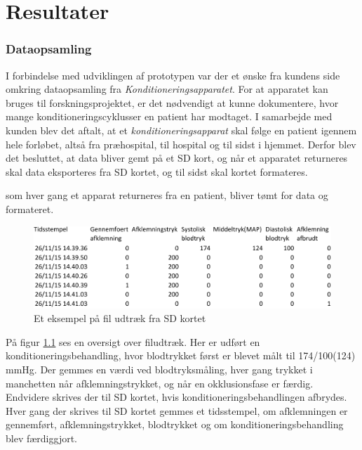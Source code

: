 \chapter{Resultater} \label{title:resultater}




\subsection{Dataopsamling}
I forbindelse med udviklingen af prototypen var der et ønske fra kundens side omkring dataopsamling fra \textit{Konditioneringsapparatet}. For at apparatet kan bruges til forskningsprojektet, er det nødvendigt at kunne dokumentere, hvor mange konditioneringscyklusser en patient har modtaget. I samarbejde med kunden blev det aftalt, at et \textit{konditioneringsapparat} skal følge en patient igennem hele forløbet, altså fra præhospital, til hospital og til sidst i hjemmet. Derfor blev det besluttet, at data bliver gemt på et SD kort, og når et apparatet returneres skal data eksporteres fra SD kortet, og til sidst skal kortet formateres.

som hver gang et apparat returneres fra en patient, bliver tømt for data og formateret. 

\begin{figure}[H]
	\includegraphics[width = \textwidth]{billeder/fileksempel-crop.pdf}
	\caption{Et eksempel på fil udtræk fra SD kortet}\label{fig:fileksempel}
\end{figure}

På figur \ref{fig:fileksempel} ses en oversigt over filudtræk. Her er udført en konditioneringsbehandling, hvor blodtrykket først er blevet målt til 174/100(124) mmHg. Der gemmes en værdi ved blodtryksmåling, hver gang trykket i manchetten når afklemningstrykket, og når en okklusionsfase er færdig. Endvidere skrives der til SD kortet, hvis konditioneringsbehandlingen afbrydes. Hver gang der skrives til SD kortet gemmes et tidsstempel, om afklemningen er gennemført, afklemningstrykket, blodtrykket og om konditioneringsbehandling blev færdiggjort. 

